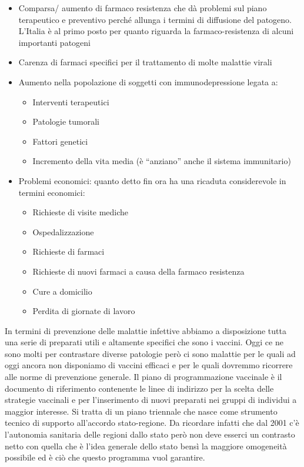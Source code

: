 \begin{itemize}
\item
  Comparsa/ aumento di farmaco resistenza che dà problemi sul piano
  terapeutico e preventivo perché allunga i termini di diffusione del
  patogeno. L'Italia è al primo posto per quanto riguarda la
  farmaco-resistenza di alcuni importanti patogeni
\item
  Carenza di farmaci specifici per il trattamento di molte malattie
  virali
\item
  Aumento nella popolazione di soggetti con immunodepressione legata a:

\begin{itemize}
\item
  Interventi terapeutici
\item
  Patologie tumorali
\item
  Fattori genetici
\item
  Incremento della vita media (è ``anziano'' anche il sistema
  immunitario)
\end{itemize}

\item
  Problemi economici: quanto detto fin ora ha una ricaduta considerevole
  in termini economici:

\begin{itemize}
\item
  Richieste di visite mediche
\item
  Ospedalizzazione
\item
  Richieste di farmaci
\item
  Richieste di nuovi farmaci a causa della farmaco resistenza
\item
  Cure a domicilio
\item
  Perdita di giornate di lavoro
\end{itemize}
\end{itemize}

  In termini di prevenzione delle malattie infettive abbiamo a
  disposizione tutta una serie di preparati utili e altamente specifici
  che sono i vaccini. Oggi ce ne sono molti per contrastare diverse
  patologie però ci sono malattie per le quali ad oggi ancora non
  disponiamo di vaccini efficaci e per le quali dovremmo ricorrere alle
  norme di prevenzione generale. Il piano di programmazione vaccinale è
  il documento di riferimento contenente le linee di indirizzo per la
  scelta delle strategie vaccinali e per l'inserimento di nuovi
  preparati nei gruppi di individui a maggior interesse. Si tratta di un
  piano triennale che nasce come strumento tecnico di supporto
  all'accordo stato-regione. Da ricordare infatti che dal 2001 c'è
  l'autonomia sanitaria delle regioni dallo stato però non deve esserci
  un contrasto netto con quella che è l'idea generale dello stato bensì
  la maggiore omogeneità possibile ed è ciò che questo programma vuol
  garantire.

